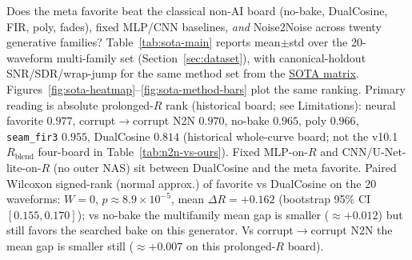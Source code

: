 Does the meta favorite beat the classical non-AI board (no-bake, DualCosine, FIR, poly, fades),
fixed MLP/CNN baselines, \emph{and} Noise2Noise across twenty generative families?
Table~\ref{tab:sota-main} reports mean$\pm$std over the 20-waveform multi-family set (Section~\ref{sec:dataset}), with canonical-holdout SNR/SDR/wrap-jump for the same method set from the \href{https://github.com/reeldemo/denoise-opt-meta/blob/master/paper/Unsupervised_Wavetable_Seam_Artifact_Repair_via_Hybrid_GA-PPO_Meta-Search_v10/figures/sota_matrix.json}{SOTA matrix}.
Figures~\ref{fig:sota-heatmap}--\ref{fig:sota-method-bars} plot the same ranking.
Primary reading is absolute prolonged-$R$ rank (historical board; see Limitations):
neural favorite $0.977$, corrupt$\to$corrupt N2N $0.970$, no-bake $0.965$, poly $0.966$,
\texttt{seam\_fir3} $0.955$, DualCosine $0.814$
(historical whole-curve board; not the v10.1 $R_{\mathrm{blend}}$ four-board in Table~\ref{tab:n2n-vs-ours}).
Fixed MLP-on-$R$ and CNN/U-Net-lite-on-$R$ (no outer NAS) sit between DualCosine and the meta favorite.
Paired Wilcoxon signed-rank (normal approx.) of favorite vs DualCosine on the 20 waveforms: $W{=}0$, $p{\approx}8.9{\times}10^{-5}$, mean $\Delta R{=}{+}0.162$ (bootstrap 95\% CI $[0.155,0.170]$); vs no-bake the multifamily mean gap is smaller ($\approx{+}0.012$) but still favors the searched bake on this generator.
Vs corrupt$\to$corrupt N2N the mean gap is smaller still ($\approx{+}0.007$ on this prolonged-$R$ board).

